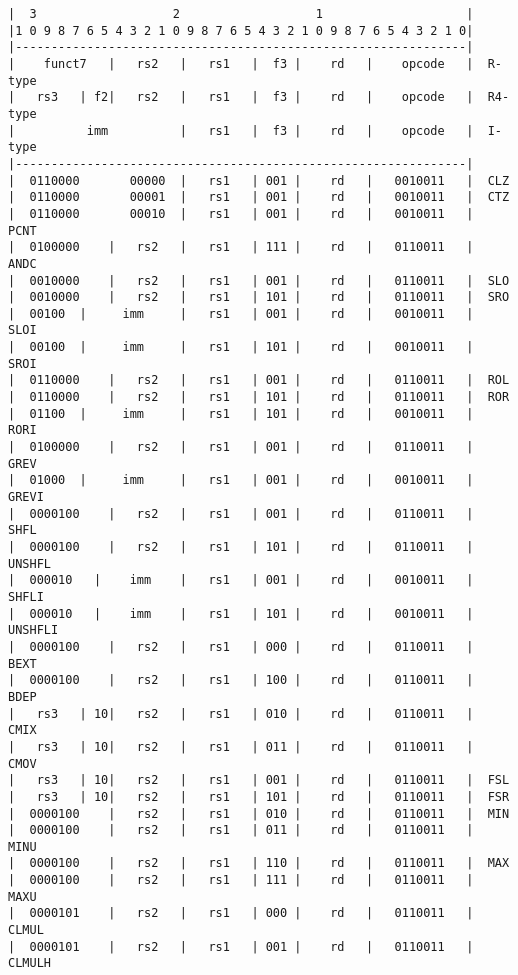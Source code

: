 \begin{verbatim}
|  3                   2                   1                    |
|1 0 9 8 7 6 5 4 3 2 1 0 9 8 7 6 5 4 3 2 1 0 9 8 7 6 5 4 3 2 1 0|
|---------------------------------------------------------------|
|    funct7   |   rs2   |   rs1   |  f3 |    rd   |    opcode   |  R-type
|   rs3   | f2|   rs2   |   rs1   |  f3 |    rd   |    opcode   |  R4-type
|          imm          |   rs1   |  f3 |    rd   |    opcode   |  I-type
|---------------------------------------------------------------|
|  0110000       00000  |   rs1   | 001 |    rd   |   0010011   |  CLZ
|  0110000       00001  |   rs1   | 001 |    rd   |   0010011   |  CTZ
|  0110000       00010  |   rs1   | 001 |    rd   |   0010011   |  PCNT
|  0100000    |   rs2   |   rs1   | 111 |    rd   |   0110011   |  ANDC
|  0010000    |   rs2   |   rs1   | 001 |    rd   |   0110011   |  SLO
|  0010000    |   rs2   |   rs1   | 101 |    rd   |   0110011   |  SRO
|  00100  |     imm     |   rs1   | 001 |    rd   |   0010011   |  SLOI
|  00100  |     imm     |   rs1   | 101 |    rd   |   0010011   |  SROI
|  0110000    |   rs2   |   rs1   | 001 |    rd   |   0110011   |  ROL
|  0110000    |   rs2   |   rs1   | 101 |    rd   |   0110011   |  ROR
|  01100  |     imm     |   rs1   | 101 |    rd   |   0010011   |  RORI
|  0100000    |   rs2   |   rs1   | 001 |    rd   |   0110011   |  GREV
|  01000  |     imm     |   rs1   | 001 |    rd   |   0010011   |  GREVI
|  0000100    |   rs2   |   rs1   | 001 |    rd   |   0110011   |  SHFL
|  0000100    |   rs2   |   rs1   | 101 |    rd   |   0110011   |  UNSHFL
|  000010   |    imm    |   rs1   | 001 |    rd   |   0010011   |  SHFLI
|  000010   |    imm    |   rs1   | 101 |    rd   |   0010011   |  UNSHFLI
|  0000100    |   rs2   |   rs1   | 000 |    rd   |   0110011   |  BEXT
|  0000100    |   rs2   |   rs1   | 100 |    rd   |   0110011   |  BDEP
|   rs3   | 10|   rs2   |   rs1   | 010 |    rd   |   0110011   |  CMIX
|   rs3   | 10|   rs2   |   rs1   | 011 |    rd   |   0110011   |  CMOV
|   rs3   | 10|   rs2   |   rs1   | 001 |    rd   |   0110011   |  FSL
|   rs3   | 10|   rs2   |   rs1   | 101 |    rd   |   0110011   |  FSR
|  0000100    |   rs2   |   rs1   | 010 |    rd   |   0110011   |  MIN
|  0000100    |   rs2   |   rs1   | 011 |    rd   |   0110011   |  MINU
|  0000100    |   rs2   |   rs1   | 110 |    rd   |   0110011   |  MAX
|  0000100    |   rs2   |   rs1   | 111 |    rd   |   0110011   |  MAXU
|  0000101    |   rs2   |   rs1   | 000 |    rd   |   0110011   |  CLMUL
|  0000101    |   rs2   |   rs1   | 001 |    rd   |   0110011   |  CLMULH

\end{verbatim}
